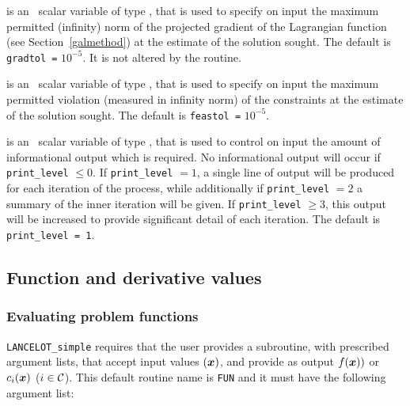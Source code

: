 \documentclass{galahad}
\begin{document}
\begin{description}
 is an \optional\ scalar variable of type \realdp,
that is used to specify on input the maximum permitted (infinity)
norm of the projected gradient of the Lagrangian function
(see Section~\ref{galmethod}) at the estimate of the solution sought.
The default is {\tt gradtol =} $10^{-5}$.  It is not altered by the routine.

 is an \optional\ scalar variable of type \realdp,
that is used to specify on input the maximum permitted violation (measured in
infinity norm) of the constraints at the estimate of the solution sought.
The default is {\tt feastol =} $10^{-5}$.

 is an \optional\ scalar variable of type \integer,
that is used to control on input the amount of informational output which is
required. No informational output will occur if {\tt print\_level} $\leq 0$. If
{\tt print\_level} $= 1$, a single line of output will be produced for each
iteration of the process, while additionally if {\tt print\_level} $= 2$
a summary of the inner iteration will be given.
If {\tt print\_level} $\geq 3$, this output will be
increased to provide significant detail of each iteration.
The default is {\tt print\_level = 1}.
\end{description}

\subsection{Function and derivative values\label{fdv}}


\subsubsection{Evaluating problem functions\label{pfe}}

{\tt LANCELOT\_simple} requires that the user provides a
subroutine, with prescribed argument lists, that accept input
values $({\bm{x}})$, and provide as output
$f({\bm{x}}))$ or $c_i({\bm{x}})$ ($i \in \calC$).
This default routine name is {\tt FUN} and it must have the following argument
list:
\end{document}
